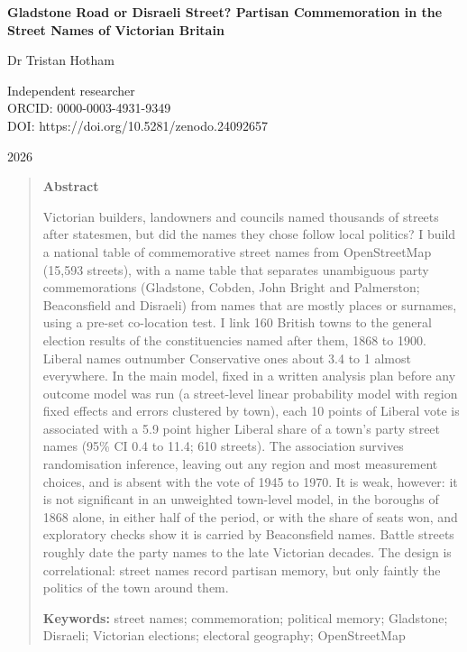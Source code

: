 \documentclass[11pt,a4paper]{article}
\begin{document}
\begin{center}
{\Large\bfseries Gladstone Road or Disraeli Street? Partisan Commemoration in the Street Names of Victorian Britain\par}
\vspace{1.2em}
{\large Dr Tristan Hotham\par}
\vspace{0.3em}
{\small Independent researcher\\
ORCID: 0000-0003-4931-9349\\
DOI: https://doi.org/10.5281/zenodo.24092657\par}
\vspace{0.8em}
2026
\end{center}

\begin{quote}
\small
\begin{center}\textbf{Abstract}\end{center}
Victorian builders, landowners and councils named thousands of streets after statesmen, but did the names they chose follow local politics? I build a national table of commemorative street names from OpenStreetMap (15,593 streets), with a name table that separates unambiguous party commemorations (Gladstone, Cobden, John Bright and Palmerston; Beaconsfield and Disraeli) from names that are mostly places or surnames, using a pre-set co-location test. I link 160 British towns to the general election results of the constituencies named after them, 1868 to 1900. Liberal names outnumber Conservative ones about 3.4 to 1 almost everywhere. In the main model, fixed in a written analysis plan before any outcome model was run (a street-level linear probability model with region fixed effects and errors clustered by town), each 10 points of Liberal vote is associated with a 5.9 point higher Liberal share of a town's party street names (95\% CI 0.4 to 11.4; 610 streets). The association survives randomisation inference, leaving out any region and most measurement choices, and is absent with the vote of 1945 to 1970. It is weak, however: it is not significant in an unweighted town-level model, in the boroughs of 1868 alone, in either half of the period, or with the share of seats won, and exploratory checks show it is carried by Beaconsfield names. Battle streets roughly date the party names to the late Victorian decades. The design is correlational: street names record partisan memory, but only faintly the politics of the town around them.

\textbf{Keywords:} street names; commemoration; political memory; Gladstone; Disraeli; Victorian elections; electoral geography; OpenStreetMap
\end{quote}
\end{document}
